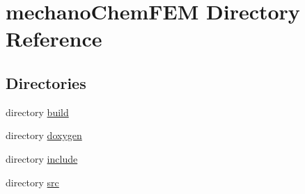\section{mechano\+Chem\+F\+EM Directory Reference}
\label{dir_25794967df2f2518f55bde92c298fe27}
\subsection*{Directories}
\begin{DoxyCompactItemize}
\item 
directory \mbox{\hyperlink{dir_1c6b873e04307873403067dd366f826b}{build}}
\item 
directory \mbox{\hyperlink{dir_e6063020cb33b4b92e90416b971e25da}{doxygen}}
\item 
directory \mbox{\hyperlink{dir_3f9746961dfccc1d4c6542f721edbabc}{include}}
\item 
directory \mbox{\hyperlink{dir_bed9c470f5df7238d8dd6d57b10c0822}{src}}
\end{DoxyCompactItemize}
